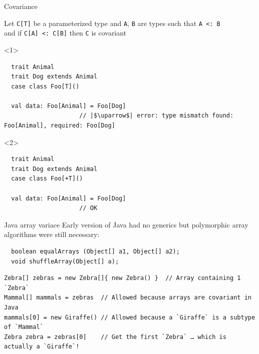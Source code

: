 \documentclass[aspectratio=169]{beamer}
\begin{document}
\begin{frame}[fragile]{Covariance}
  \begin{block}{}
  Let \texttt{C[T]} be a parameterized type and \texttt{A}, \texttt{B} are types such that \texttt{A <:
  B} \\
  and if \texttt{C[A] <: C[B]} then \texttt{C} is \alert{covariant} 
  \end{block}
  \vspace{1em}
\begin{onlyenv}<1>
    \begin{verbatim}
  trait Animal
  trait Dog extends Animal
  case class Foo[T]()
  
  val data: Foo[Animal] = Foo[Dog]
                     // |$\uparrow$| error: type mismatch found: Foo[Animal], required: Foo[Dog]
  \end{verbatim}
\end{onlyenv}
\begin{onlyenv}<2>
    \begin{verbatim}
  trait Animal
  trait Dog extends Animal
  case class Foo[+T]()
  
  val data: Foo[Animal] = Foo[Dog] 
                     // OK
  \end{verbatim}
\end{onlyenv}
\end{frame}


\begin{frame}[fragile]{Java array variace}
  Early version of Java had no generics but polymorphic array algorithms were still necessary:
  \vspace{1em}
  \begin{verbatim}
  boolean equalArrays (Object[] a1, Object[] a2);
  void shuffleArray(Object[] a);
  \end{verbatim}
  \vspace{1em}
  \pause
  \begin{verbatim}
Zebra[] zebras = new Zebra[]{ new Zebra() }  // Array containing 1 `Zebra`
Mammal[] mammals = zebras  // Allowed because arrays are covariant in Java
mammals[0] = new Giraffe() // Allowed because a `Giraffe` is a subtype of `Mammal`
Zebra zebra = zebras[0]    // Get the first `Zebra` … which is actually a `Giraffe`!
  \end{verbatim}
\end{frame}
\end{document}
